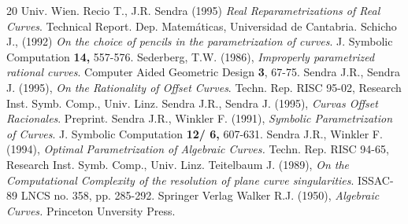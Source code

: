 \begin{thebibliography}{20}
Univ. Wien.
\bibitem{} Recio T., J.R. Sendra (1995) {\it Real Reparametrizations of 
Real Curves}. Technical Report. Dep. Matem\'aticas, Universidad de 
Cantabria.
\bibitem{} Schicho J., (1992) {\it On the choice of pencils in 
the parametrization of curves}. J. Symbolic Computation 
{\bf  14,} 557-576.
\bibitem{} Sederberg, T.W. (1986), {\it Improperly parametrized 
rational curves}. Computer Aided Geometric Design {\bf 3}, 67-75.
\bibitem{} Sendra J.R., Sendra J. (1995), {\it On the  Rationality of 
Offset  Curves}. Techn. Rep. RISC 95-02, Research 
Inst. Symb. Comp., Univ. Linz.
\bibitem{} Sendra J.R., Sendra J. (1995), {\it Curvas Offset Racionales}. 
Preprint.
\bibitem{} Sendra J.R., Winkler F. (1991), 
{\it Symbolic Parametrization of Curves}. J. Symbolic Computation 
{\bf 12/ 6,} 607-631.
\bibitem{} Sendra J.R., Winkler F. (1994), 
{\it Optimal Parametrization of Algebraic Curves.} 
Techn. Rep. RISC 94-65, Research Inst. Symb. Comp., Univ. Linz.
\bibitem{} Teitelbaum J. (1989), {\it On the Computational Complexity of 
the resolution of plane curve singularities}. ISSAC-89 LNCS no. 358, 
pp. 285-292. Springer Verlag
\bibitem{} Walker R.J. (1950), {\it  Algebraic Curves.} Princeton 
Unversity Press.
\end{thebibliography}

